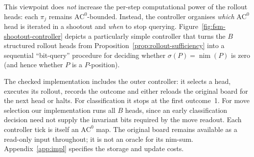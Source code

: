 \documentclass[twoside,11pt]{article}
\newcommand{\AC}{\mathrm{AC}}
\numberwithin{theorem}{section}
\numberwithin{equation}{section}
\begin{document}
This viewpoint does \emph{not} increase the per-step computational power of the rollout heads: each $\pi_j$ remains $\AC^0$-bounded.
Instead, the controller organises \emph{which} $\AC^0$ head is iterated in a shootout and \emph{when} to stop querying.
Figure~\ref{fig:fsm-shootout-controller} depicts a particularly simple controller that turns the $B$ structured rollout heads from Proposition~\ref{prop:rollout-sufficiency} into a sequential ``bit-query'' procedure for deciding whether $\sigma(P)=\operatorname{nim}(P)$ is zero (and hence whether $P$ is a $P$-position).

The checked implementation includes the outer controller: it selects a head, executes its rollout, records the outcome and either reloads the original board for the next head or halts. For classification it stops at the first outcome~1. For move selection our implementation runs all $B$ heads, since an early classification decision need not supply the invariant bits required by the move readout. Each controller tick is itself an $\AC^0$ map. The original board remains available as a read-only input throughout; it is not an oracle for its nim-sum. Appendix~\ref{app:impl} specifies the storage and update costs.
\end{document}
